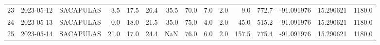 \documentclass[12pt]{article}
\begin{document}
\begin{center}
\begin{tabular}{lllrrrrrrrrrrrr}
23  & 2023-05-12 &  SACAPULAS &     3.5 &  17.5 &   26.4 &  35.5 &     70.0 &  7.0 &         2.0 &         9.0 &      772.7 & -91.091976 &  15.290621 &   1180.0 \\
24  & 2023-05-13 &  SACAPULAS &     0.0 &  18.0 &   21.5 &  35.0 &     75.0 &  4.0 &         2.0 &        45.0 &      515.2 & -91.091976 &  15.290621 &   1180.0 \\
25  & 2023-05-14 &  SACAPULAS &    21.0 &  17.0 &   24.4 &   NaN &     76.0 &  6.0 &         2.0 &       157.5 &      775.4 & -91.091976 &  15.290621 &   1180.0 \\
\bottomrule
\end{tabular}

        
        \end{center}
        
\end{document}
